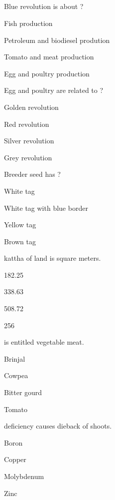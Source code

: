 
\subsection*{}

\begin{questions}

\question Blue revolution is about ?
\begin{items}
\item* Fish production
\item Petroleum and biodiesel prodution
\item Tomato and meat production
\item Egg and poultry production
\end{items}

\question Egg and poultry are related to ?
\begin{items}
\item Golden revolution
\item Red revolution
\item* Silver revolution
\item Grey revolution
\end{items}

\question Breeder seed has \fillin[][3cm]?
\begin{items}
\item White tag
\item White tag with blue border
\item Yellow tag
\item* Brown tag
\end{items}

 kattha of land is \fillin[][3cm] square meters.
\begin{items}
\item 182.25
\item* 338.63
\item 508.72
\item 256
\end{items}

\question \fillin[][2.5cm] is entitled vegetable meat.
\begin{items}
\item Brinjal
\item Cowpea
\item Bitter gourd
\item Tomato
\end{items}

\question \fillin[][3cm] deficiency causes dieback of shoots.
\begin{items}
\item Boron
\item* Copper
\item Molybdenum
\item Zinc
\end{items}


\end{questions}
